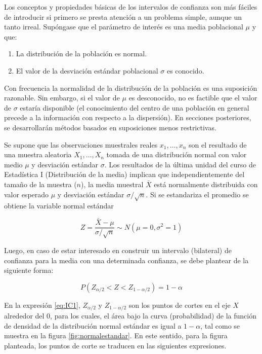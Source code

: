 \documentclass[
  11pt,
]{book}
\providecommand{\tightlist}{%
  \setlength{\itemsep}{0pt}\setlength{\parskip}{0pt}}
\theoremstyle{definition}
\theoremstyle{definition}
\theoremstyle{definition}
\theoremstyle{definition}
\theoremstyle{remark}
\begin{document}
Los conceptos y propiedades básicas de los intervalos de confianza son más fáciles de introducir si primero se presta atención a un problema simple, aunque un tanto irreal. Supóngase que el parámetro de interés es una media poblacional \(\mu\) y que:

\begin{enumerate}
\def\labelenumi{\arabic{enumi}.}
\tightlist
\item
  La distribución de la población es normal.
\item
  El valor de la desviación estándar poblacional \(\sigma\) es conocido.
\end{enumerate}

Con frecuencia la normalidad de la distribución de la población es una suposición razonable. Sin embargo, si el valor de \(\mu\) es desconocido, no es factible que el valor de \(\sigma\) estaría disponible (el conocimiento del centro de una población en general precede a la información con respecto a la dispersión). En secciones posteriores, se desarrollarán métodos basados en suposiciones menos restrictivas. \citep[página 254]{Devore}

Se supone que las observaciones muestrales reales \(x_1,\ldots , x_n\) son el resultado de una muestra aleatoria \(X_1,\ldots , X_n\) tomada de una distribución normal con valor medio \(\mu\) y desviación estándar \(\sigma\). Los resultados de la última unidad del curso de Estadística I (Distribución de la media) implican que independientemente del tamaño de la muestra (\(n\)), la media muestral \(\bar{X}\) está normalmente distribuida con valor esperado \(\mu\) y desviación estándar \(\sigma/\sqrt{n}\). Si se estandariza el promedio se obtiene la variable normal estándar

\begin{equation}
Z = \frac{\bar{X} - \mu}{\sigma/\sqrt{n}} \sim N(\mu = 0,\sigma^2=1)
\label{eq:normalestandar}
\end{equation}

Luego, en caso de estar interesado en construir un intervalo (bilateral) de confianza para la media con una determinada confianza, se debe plantear de la siguiente forma:

\begin{equation}
P\left( Z_{\alpha/2} < Z < Z_{1-\alpha/2}\right) = 1-\alpha
\label{eq:IC1}
\end{equation}

En la expresión \eqref{eq:IC1}, \(Z_{\alpha/2}\) y \(Z_{1-\alpha/2}\) son los puntos de cortes en el eje \(X\) alrededor del 0, para los cuales, el área bajo la curva (probabilidad) de la función de densidad de la distribución normal estándar es igual a \(1-\alpha\), tal como se muestra en la figura \ref{fig:normalestandar}. En este sentido, para la figura planteada, los puntos de corte se traducen en las siguientes expresiones.
\end{document}
